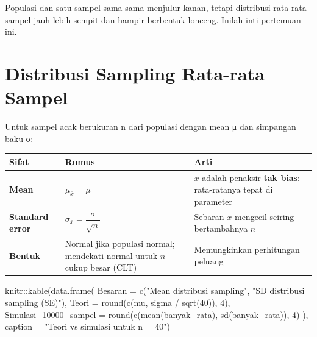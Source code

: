 \documentclass[
  indonesian,
  letterpaper,
]{book}
\newenvironment{Shaded}{\begin{snugshade}}{\end{snugshade}}
\newcommand{\AttributeTok}[1]{\textcolor[rgb]{0.40,0.45,0.13}{#1}}
\newcommand{\DecValTok}[1]{\textcolor[rgb]{0.68,0.00,0.00}{#1}}
\newcommand{\FunctionTok}[1]{\textcolor[rgb]{0.28,0.35,0.67}{#1}}
\newcommand{\NormalTok}[1]{\textcolor[rgb]{0.00,0.23,0.31}{#1}}
\newcommand{\SpecialCharTok}[1]{\textcolor[rgb]{0.37,0.37,0.37}{#1}}
\newcommand{\StringTok}[1]{\textcolor[rgb]{0.13,0.47,0.30}{#1}}
\newcounter{none} %
\begin{document}
Populasi dan satu sampel sama-sama menjulur kanan, tetapi distribusi
rata-rata sampel jauh lebih sempit dan hampir berbentuk lonceng. Inilah
inti pertemuan ini.


\chapter{Distribusi Sampling Rata-rata
Sampel}\label{distribusi-sampling-rata-rata-sampel}

Untuk sampel acak berukuran n dari populasi dengan mean μ dan simpangan
baku σ:

{\def\LTcaptype{none} %
\begin{longtable}[]{@{}
  >{\raggedright\arraybackslash}p{}
  >{\raggedright\arraybackslash}p{}
  >{\raggedright\arraybackslash}p{}@{}}
\toprule\noalign{}
\begin{minipage}[b]{\linewidth}\raggedright
Sifat
\end{minipage} & \begin{minipage}[b]{\linewidth}\raggedright
Rumus
\end{minipage} & \begin{minipage}[b]{\linewidth}\raggedright
Arti
\end{minipage} \\
\midrule\noalign{}
\endhead
\bottomrule\noalign{}
\endlastfoot
\textbf{Mean} & \(\mu_{\bar{x}} = \mu\) & \(\bar{x}\) adalah penaksir
\textbf{tak bias}: rata-ratanya tepat di parameter \\
\textbf{Standard error} &
\(\sigma_{\bar{x}} = \dfrac{\sigma}{\sqrt{n}}\) & Sebaran \(\bar{x}\)
mengecil seiring bertambahnya \(n\) \\
\textbf{Bentuk} & Normal jika populasi normal; mendekati normal untuk
\(n\) cukup besar (CLT) & Memungkinkan perhitungan peluang \\
\end{longtable}
}

\begin{Shaded}
\begin{Highlighting}[]
\NormalTok{knitr}\SpecialCharTok{::}\FunctionTok{kable}\NormalTok{(}\FunctionTok{data.frame}\NormalTok{(}
\AttributeTok{Besaran =} \FunctionTok{c}\NormalTok{(}\StringTok{"Mean distribusi sampling"}\NormalTok{, }\StringTok{"SD distribusi sampling (SE)"}\NormalTok{),}
\AttributeTok{Teori =} \FunctionTok{round}\NormalTok{(}\FunctionTok{c}\NormalTok{(mu, sigma }\SpecialCharTok{/} \FunctionTok{sqrt}\NormalTok{(}\DecValTok{40}\NormalTok{)), }\DecValTok{4}\NormalTok{),}
\AttributeTok{Simulasi\_10000\_sampel =} \FunctionTok{round}\NormalTok{(}\FunctionTok{c}\NormalTok{(}\FunctionTok{mean}\NormalTok{(banyak\_rata), }\FunctionTok{sd}\NormalTok{(banyak\_rata)), }\DecValTok{4}\NormalTok{)}
\NormalTok{), }\AttributeTok{caption =} \StringTok{"Teori vs simulasi untuk n = 40"}\NormalTok{)}
\end{Highlighting}
\end{Shaded}
\end{document}
